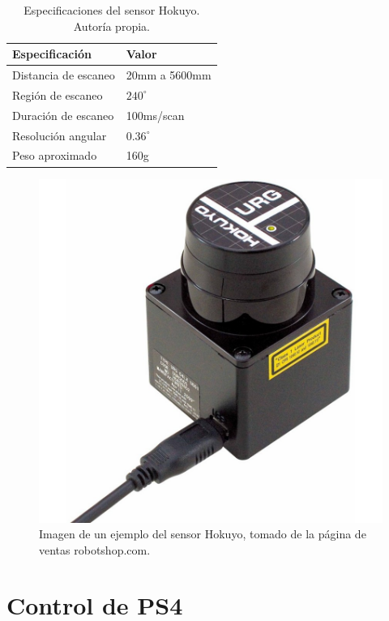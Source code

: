 \begin{table}[H]
\caption{Especificaciones del sensor Hokuyo. Autoría propia.}
\begin{tabular}{|l|l|}
\hline
Especificación       & Valor         \\ \hline
Distancia de escaneo & 20mm a 5600mm \\ \hline
Región de escaneo    & $240^\circ$           \\ \hline
Duración de escaneo  & 100ms/scan    \\ \hline
Resolución angular   & $0.36^\circ$ \\ \hline
Peso aproximado & 160g \\ \hline
\end{tabular}
\label{T:hokuyo}
\end{table}

\begin{figure}[H]
\centering
\includegraphics[scale=0.3]{imagenes/hokuyo.jpg}
\caption{Imagen de un ejemplo del sensor Hokuyo, tomado de la página de ventas robotshop.com.}
\label{F:hokuyofoto}
\end{figure}

\section{Control de PS4}

